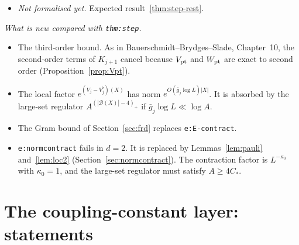 \documentclass[11pt]{amsart}
\theoremstyle{definition}
\theoremstyle{remark}
\numberwithin{equation}{section}
\newcommand{\cB}{\mathcal{B}}
\begin{document}
\begin{itemize}
  \begin{itemize}
  \item intermediate results for $K^{\rm pf}_{j+1}$ and $M$: \texttt{H02UV/Step2/Map/Main.lean},
    \texttt{H02UV/Step2/Map/Reapp.lean}, \texttt{H02UV/Step2/Map/Lambda.lean};
  \item locality, symmetry and coordinates: \texttt{H02UV/Step2/Map/Mem.lean}, \texttt{H02UV/Step2/Map/Coord.lean};
  \item factorisation: \texttt{H02UV/Step2/Map/ZetaFact.lean}, \texttt{H02UV/Step2/Map/Fact.lean};
  \item the change of variables: \texttt{H02UV/Step2/Map/Reblock.lean}, \texttt{H02UV/Step2/Map/ReblockBound.lean},
    \texttt{H02UV/Step2/Map/Split.lean};
  \item the theorem: \texttt{H02UV/Step2/Map/StepFinal.lean}.
  \end{itemize}
  The ingredients of the Cauchy argument are \texttt{Knext2\_expansion}, \texttt{Knext2\_lin},
  \texttt{Llin2\_bound}, \texttt{Knext2\_crude}, \texttt{Knext2\_hol} and the lemmas of
  \texttt{H02UV/Step2/Map/Cauchy.lean}. The constant $C(L,A)$ is not tracked.
\item \emph{Not formalised yet.} Expected result~\ref{thm:step-rest}.
\end{itemize}

\emph{What is new compared with \texttt{thm:step}.}
\begin{itemize}
\item The third-order bound. As in Bauerschmidt--Brydges--Slade, Chapter~10, the second-order
  terms of $K_{j+1}$ cancel because $V_{\rm pt}$ and $W_{\rm pt}$ are exact to second order
  (Proposition~\ref{prop:Vpt}).
\item The local factor $e^{(V_j-V_j^\flat)(X)}$ has norm $e^{O(\bar g_j\log L)|X|}$. It is
  absorbed by the large-set regulator $A^{(|\cB(X)|-4)_+}$ if $\bar g_j\log L\ll\log A$.
\item The Gram bound of Section~\ref{sec:frd} replaces \texttt{e:E-contract}.
\item \texttt{e:normcontract} fails in $d=2$. It is replaced by Lemmas~\ref{lem:pauli}
  and~\ref{lem:loc2} (Section~\ref{sec:normcontract}). The contraction factor is
  $L^{-\kappa_0}$ with $\kappa_0=1$, and the large-set regulator must satisfy $A\ge4C_*$.
\end{itemize}

\section{The coupling-constant layer: statements}
\label{sec:coupling}
\end{document}
